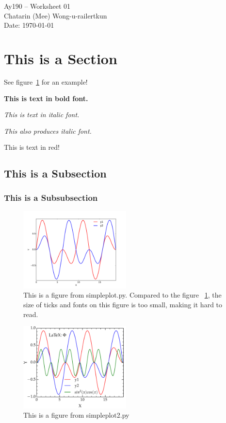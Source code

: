 \documentclass[11pt,letterpaper]{article}
\begin{document}
\begin{center}
\Large
Ay190 -- Worksheet 01\\
Chatarin (Mee) Wong-u-railertkun\\
Date: \today
\end{center}

\section{This is a Section}

See figure~\ref{fig:simpleplot2} for an example!

{\bf This is text in bold font.}

\emph{This is text in italic font.}

{\it This also produces italic font.}

{\color{red} This is text in red!}

\subsection{This is a Subsection}

\subsubsection{This is a Subsubsection}

\begin{figure}[bth]
	\centering
	\includegraphics[width=0.5\textwidth]{simpleplot.pdf}
	\caption{This is a figure from simpleplot.py. Compared to the figure ~\ref{fig:simpleplot2}, the size of ticks and fonts on this figure is too small, making it hard to read.}
\end{figure}

\begin{figure}[bth]
	\centering
	\includegraphics[width=0.5\textwidth]{simpleplot2.pdf}
	\caption{This is a figure from simpleplot2.py}
	\label{fig:simpleplot2}
\end{figure}
	
	
\end{document}
